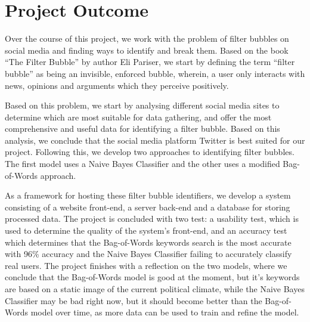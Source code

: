\section{Project Outcome}
Over the course of this project, we work with the problem of filter bubbles on
social media and finding ways to identify and break them. Based on the book
``The Filter Bubble''\citep{pariser2011filter} by author Eli Pariser, we start
by defining the term ``filter bubble'' as being an invisible, enforced bubble,
wherein, a user only interacts with news, opinions and arguments which they
perceive positively. 

Based on this problem, we start by analysing different social media sites to
determine which are most suitable for data gathering, and offer the most
comprehensive and useful data for identifying a filter bubble.
Based on this analysis, we conclude that the social media platform Twitter is
best suited for our project. Following this, we develop two approaches to
identifying filter bubbles. The first model uses a Naive Bayes Classifier and
the other uses a modified Bag-of-Words approach.

As a framework for hosting these filter bubble identifiers, we develop a system
consisting of a website front-end, a server back-end and a database for storing
processed data. The project is concluded with two test: a usability test, which
is used to determine the quality of the system's front-end, and an accuracy
test which determines that the Bag-of-Words keywords search is the most
accurate with 96\% accuracy and the Naive Bayes Classifier failing to accurately
classify real users.
The project finishes with a reflection on the two models, where we conclude that
the Bag-of-Words model is good at the moment, but it's keywords are based on a
static image of the current political climate, while the Naive Bayes Classifier
may be bad right now, but it should become better than the Bag-of-Words model over
time, as more data can be used to train and refine the model.



















